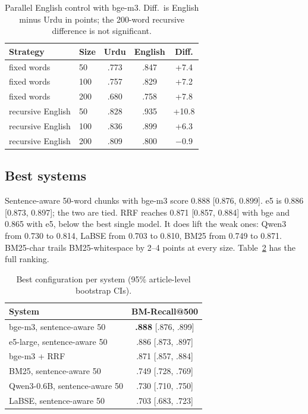 \documentclass[11pt]{article}
\newcommand{\bb}[1]{\textbf{#1}}
\begin{document}
\begin{table}[t]
\centering
\small
\begin{tabular}{llccc}
\toprule
Strategy & Size & Urdu & English & Diff. \\
\midrule
fixed words & 50 & .773 & .847 & +7.4 \\
fixed words & 100 & .757 & .829 & +7.2 \\
fixed words & 200 & .680 & .758 & +7.8 \\
recursive English & 50 & .828 & .935 & +10.8 \\
recursive English & 100 & .836 & .899 & +6.3 \\
recursive English & 200 & .809 & .800 & $-$0.9 \\
\bottomrule
\end{tabular}
\caption{Parallel English control with bge-m3. Diff.\ is English minus Urdu in points; the 200-word
recursive difference is not significant.}
\label{tab:english}
\end{table}

\subsection{Best systems}

Sentence-aware 50-word chunks with bge-m3 score 0.888 [0.876, 0.899]. e5 is 0.886 [0.873, 0.897];
the two are tied. RRF reaches 0.871 [0.857, 0.884] with bge and 0.865 with e5, below the best single
model. It does lift the weak ones: Qwen3 from 0.730 to 0.814, LaBSE from 0.703 to 0.810, BM25 from
0.749 to 0.871. BM25-char trails BM25-whitespace by 2--4 points at every size. Table~\ref{tab:best}
has the full ranking.

\begin{table}[t]
\centering
\small
\begin{tabular}{lc}
\toprule
System & BM-Recall@500 \\
\midrule
bge-m3, sentence-aware 50 & \bb{.888} [.876, .899] \\
e5-large, sentence-aware 50 & .886 [.873, .897] \\
bge-m3 + RRF & .871 [.857, .884] \\
BM25, sentence-aware 50 & .749 [.728, .769] \\
Qwen3-0.6B, sentence-aware 50 & .730 [.710, .750] \\
LaBSE, sentence-aware 50 & .703 [.683, .723] \\
\bottomrule
\end{tabular}
\caption{Best configuration per system (95\% article-level bootstrap CIs).}
\label{tab:best}
\end{table}
\end{document}
